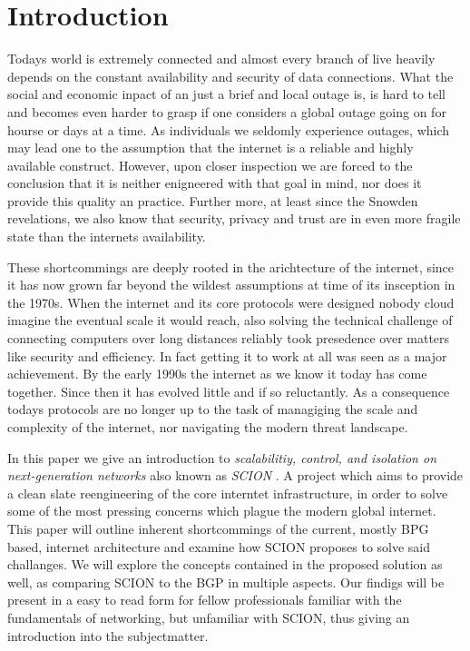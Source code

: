 \documentclass[../eva1_scion.tex]{subfiles}
\begin{document}
\section{Introduction}\label{sec:introduction}
\setcounter{page}{1}

Todays world is extremely connected and almost every branch of live heavily depends on the constant availability and security of data connections. What the social and economic inpact of an just a brief and local outage is, is hard to tell and becomes even harder to grasp if one considers a global outage going on for hourse or days at a time. As individuals we seldomly experience outages, which may lead one to the assumption that the internet is a reliable and highly available construct. However, upon closer inspection we are forced to the conclusion that it is neither enigneered with that goal in mind, nor does it provide this quality an practice. Further more, at least since the Snowden revelations, we also know that security, privacy and trust are in even more fragile state than the internets availability.

These shortcommings are deeply rooted in the arichtecture of the internet, since it has now grown far beyond the wildest assumptions at time of its insception in the 1970s. When the internet and its core protocols were designed nobody cloud imagine the eventual scale it would reach, also solving the technical challenge of connecting computers over long distances reliably took presedence over matters like security and efficiency. In fact getting it to work at all was seen as a major achievement. By the early 1990s the internet as we know it today has come together. Since then it has evolved little and if so reluctantly. As a consequence todays protocols are no longer up to the task of managiging the scale and complexity of the internet, nor navigating the modern threat landscape.

In this paper we give an introduction to \textit{scalabilitiy, control, and isolation on next-generation networks} also known as \textit{ SCION }. A project which aims to provide a clean slate reengineering of the core interntet infrastructure, in order to solve some of the most pressing concerns which plague the modern global internet. This paper will outline inherent shortcommings of the current, mostly BPG based, internet architecture and examine how SCION proposes to solve said challanges. We will explore the concepts contained in the proposed solution as well, as comparing SCION to the BGP in multiple aspects. Our findigs will be present in a easy to read form for fellow professionals familiar with the fundamentals of networking, but unfamiliar with SCION, thus giving an introduction into the subjectmatter.
\end{document}
